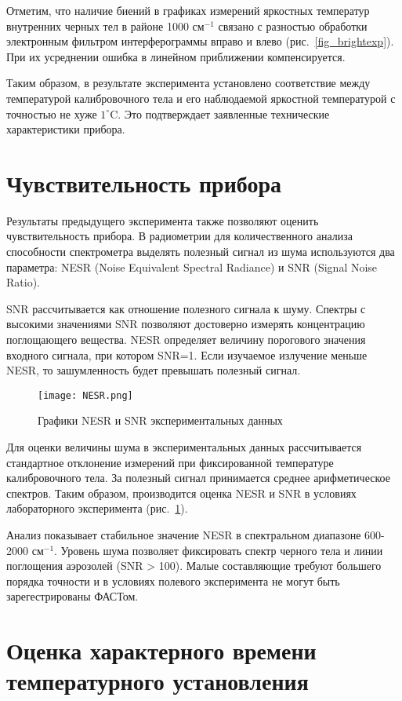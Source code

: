 \documentclass{mipt-thesis-bs}
\begin{document}
	
	Отметим, что наличие биений в графиках измерений яркостных температур внутренних черных тел в районе 1000 $см^{-1}$ связано с разностью обработки электронным фильтром интерферограммы вправо и влево (рис.~\ref{fig_brightexp}). При их усреднении ошибка в линейном приближении компенсируется.
	
		
Таким образом, в результате эксперимента установлено соответствие между температурой калибровочного тела и его наблюдаемой яркостной температурой с точностью не хуже $1^\circ$C. Это подтверждает заявленные технические характеристики прибора.

	\section{Чувствительность прибора}
	
	Результаты предыдущего эксперимента также позволяют оценить чувствительность прибора. В радиометрии для количественного анализа способности спектрометра выделять полезный сигнал из шума используются два параметра: NESR (Noise Equivalent Spectral Radiance) и SNR (Signal Noise Ratio). 
	
	SNR рассчитывается как отношение полезного сигнала к шуму. Спектры с высокими значениями SNR позволяют достоверно измерять концентрацию поглощающего вещества. NESR определяет величину порогового значения входного сигнала, при котором SNR=1. Если изучаемое излучение меньше NESR, то зашумленность будет превышать полезный сигнал. 
	
	\begin{figure}[h!]
		\centering
		\texttt{[image: NESR.png]}
		\caption{Графики NESR и SNR экспериментальных данных}
		\label{NESR}
	\end{figure}
	
	
	Для оценки величины шума в экспериментальных данных рассчитывается стандартное отклонение измерений при фиксированной температуре калибровочного тела. За полезный сигнал принимается среднее арифметическое спектров. Таким образом, производится оценка NESR и SNR в условиях лабораторного эксперимента (рис.~\ref{NESR}).
	
	Анализ показывает стабильное значение NESR в спектральном диапазоне 600-2000 $см^{-1}$. Уровень шума позволяет фиксировать спектр черного тела и линии поглощения аэрозолей (SNR > 100). Малые составляющие требуют большего порядка точности и в условиях полевого эксперимента не могут быть зарегестрированы ФАСТом.   

	\section{Оценка характерного времени температурного установления}
	
\end{document}
